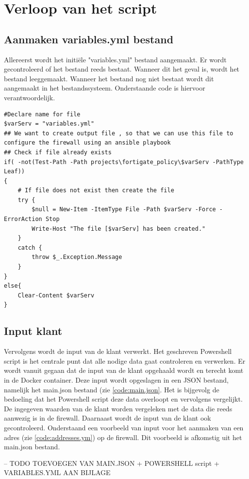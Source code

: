 \section{Verloop van het script}
\subsection{Aanmaken variables.yml bestand}
Allereerst wordt het initiële "variables.yml" bestand aangemaakt. Er wordt gecontroleerd of het bestand reeds bestaat. Wanneer dit het geval is, wordt het bestand leeggemaakt. Wanneer het bestand nog niet bestaat wordt dit aangemaakt in het bestandssysteem. Onderstaande code is hiervoor verantwoordelijk. 

\begin{lstlisting}[caption={main.ps1, aanmaken variables.yml}]
#Declare name for file 
$varServ = "variables.yml"
## We want to create output file , so that we can use this file to configure the firewall using an ansible playbook
## Check if file already exists
if( -not(Test-Path -Path projects\fortigate_policy\$varServ -PathType Leaf)) 
{
    # If file does not exist then create the file 
    try {
        $null = New-Item -ItemType File -Path $varServ -Force -ErrorAction Stop
        Write-Host "The file [$varServ] has been created."
    }
    catch {
        throw $_.Exception.Message
    }
}
else{
    Clear-Content $varServ
}
\end{lstlisting}

\subsection{Input klant}
\label{subsec: input klant}
Vervolgens wordt de input van de klant verwerkt. Het geschreven Powershell script is het centrale punt dat alle nodige data gaat controleren en verwerken. Er wordt vanuit gegaan dat de input van de klant opgehaald wordt en terecht komt in de Docker container. Deze input wordt opgeslagen in een JSON bestand, namelijk het main.json bestand (zie \ref{code:main.json}. Het is bijgevolg de bedoeling dat het Powershell script deze data overloopt en vervolgens vergelijkt. De ingegeven waarden van de klant worden vergeleken met de data die reeds aanwezig is in de firewall. Daarnaast wordt de input van de klant ook gecontroleerd. Onderstaand een voorbeeld van input voor het aanmaken van een adres (zie \ref{code:addresses.ym}) op de firewall. Dit voorbeeld is afkomstig uit het main.json bestand. 

-- TODO TOEVOEGEN VAN MAIN.JSON + POWERSHELL script + VARIABLES.YML AAN BIJLAGE

